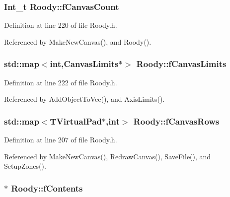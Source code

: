 \subsubsection[{fCanvasCount}]{\setlength{\rightskip}{0pt plus 5cm}Int\_\-t {\bf Roody::fCanvasCount}\hspace{0.3cm}{\ttfamily  [private]}}\label{classRoody_a655286d7d4ad8c859e130c58372ded4f}


Definition at line 220 of file Roody.h.



Referenced by MakeNewCanvas(), and Roody().

\subsubsection[{fCanvasLimits}]{\setlength{\rightskip}{0pt plus 5cm}std::map$<$int,CanvasLimits$\ast$$>$ {\bf Roody::fCanvasLimits}\hspace{0.3cm}{\ttfamily  [private]}}\label{classRoody_a6fd004943ff3d8ee9e081dbdc18c2238}


Definition at line 222 of file Roody.h.



Referenced by AddObjectToVec(), and AxisLimits().

\subsubsection[{fCanvasRows}]{\setlength{\rightskip}{0pt plus 5cm}std::map$<$TVirtualPad$\ast$,int$>$ {\bf Roody::fCanvasRows}\hspace{0.3cm}{\ttfamily  [private]}}\label{classRoody_a5a2e7e58f4e6c7365092297a15904c84}


Definition at line 207 of file Roody.h.



Referenced by MakeNewCanvas(), RedrawCanvas(), SaveFile(), and SetupZones().

\subsubsection[{fContents}]{$\ast$ {\bf Roody::fContents}\hspace{0.3cm}{\ttfamily  [protected]}}\label{classRoody_a58d82692b76daddd62008acd8613a165}


